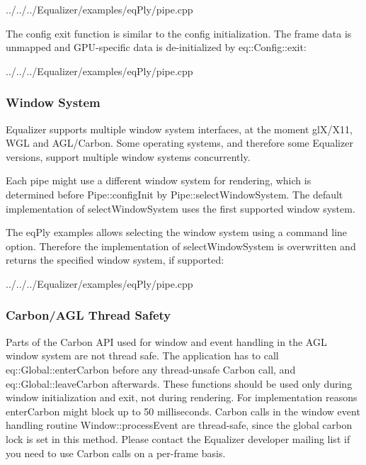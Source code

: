 \documentclass[10pt,a4]{scrartcl}
\begin{document}
{\footnotesize
  {../../../Equalizer/examples/eqPly/pipe.cpp}}

The config exit function is similar to the config initialization. The
frame data is unmapped and GPU-specific data is de-initialized by
\textsf{eq::Config::exit}:

{\footnotesize
  {../../../Equalizer/examples/eqPly/pipe.cpp}}

\subsubsection{Window System}

Equalizer supports multiple window system interfaces, at the moment glX/X11, WGL
and AGL/Carbon. Some operating systems, and therefore some Equalizer versions,
support multiple window systems concurrently.

Each pipe might use a different window system for rendering, which is determined
before \textsf{Pipe::configInit} by \textsf{Pipe::selectWindowSystem}. The
default implementation of \textsf{selectWindowSystem} uses the first supported
window system.

The \textsf{eqPly} examples allows selecting the window system using a
command line option. Therefore the implementation of
\textsf{selectWindowSystem} is overwritten and returns the specified
window system, if supported:

{\footnotesize
  {../../../Equalizer/examples/eqPly/pipe.cpp}}

\subsubsection{\label{sCarbonThread}Carbon/AGL Thread Safety}

Parts of the Carbon API used for window and event handling in the AGL window
system are not thread safe. The application has to call
\textsf{eq::Global::enterCarbon} before any thread-unsafe Carbon call, and
\textsf{eq::Global::leaveCarbon} afterwards. These functions should be used only
during window initialization and exit, not during rendering. For implementation
reasons \textsf{enterCarbon} might block up to 50 milliseconds. Carbon calls in
the window event handling routine \textsf{Window::processEvent} are thread-safe,
since the global carbon lock is set in this method. Please contact the Equalizer
developer mailing list if you need to use Carbon calls on a per-frame basis.
\end{document}
